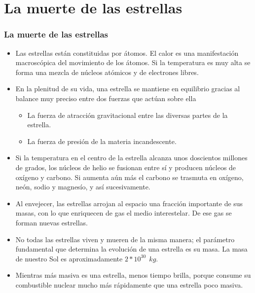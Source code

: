 \documentclass{beamer}
\begin{document}
\section[La muerte de las estrellas]{La muerte de las estrellas}
\begin{frame}
\frametitle{La muerte de las estrellas}
 \begin{itemize}
  \item Las estrellas están constituidas por átomos. El calor es una manifestación macroscópica del movimiento de los átomos. Si la temperatura es muy alta se forma una mezcla de núcleos atómicos y de electrones libres.
  \item En la plenitud de su vida, una estrella se mantiene en equilibrio gracias al balance muy preciso entre dos fuerzas que actúan sobre ella
    \begin{itemize}
     \item La fuerza de atracción gravitacional entre las diversas partes de la estrella. 
     \item La fuerza de presión de la materia incandescente.
    \end{itemize}
  \item Si la temperatura en el centro de la estrella alcanza unos doscientos millones de grados, los núcleos de helio se fusionan entre sí y producen núcleos de oxígeno y carbono. Si aumenta aún más el carbono se trasmuta en oxígeno, neón, sodio y magnesío, y así sucesivamente.
 \end{itemize}
\end{frame}
\begin{frame}
 \begin{itemize}
  \item Al envejecer, las estrellas arrojan al espacio una fracción importante de sus masas, con lo que enriquecen de gas el medio interestelar. De ese gas se forman nuevas estrellas.
  \item No todas las estrellas viven y mueren de la misma manera; el parámetro fundamental que determina la evolución de una estrella es su masa. La masa de nuestro Sol es aproximadamente $2*10^{30}\ \ kg$.
  \item Mientras más masiva es una estrella, menos tiempo brilla, porque consume su combustible nuclear mucho más rápidamente que una estrella poco masiva.
 \end{itemize}
\end{frame}
\end{document}
